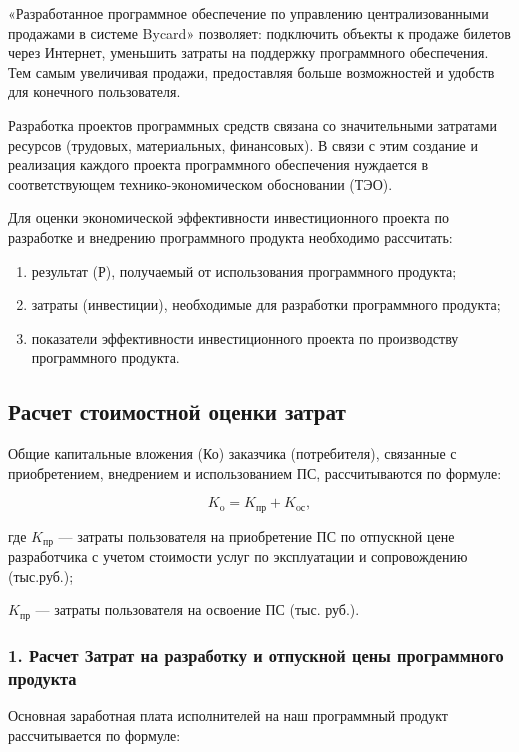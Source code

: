 «Разработанное программное обеспечение по управлению централизованными продажами в системе Bycard» позволяет: подключить объекты к продаже билетов через Интернет, уменьшить затраты на поддержку программного обеспечения. Тем самым увеличивая продажи, предоставляя больше возможностей и удобств для конечного пользователя.

Разработка проектов программных средств связана со значительными затратами ресурсов (трудовых, материальных, финансовых). В связи с этим создание и реализация каждого проекта программного обеспечения нуждается в соответствующем технико-экономическом обосновании (ТЭО).

Для оценки экономической эффективности инвестиционного проекта по разработке и внедрению программного продукта необходимо рассчитать:
\begin{enumerate}
    \item результат (Р), получаемый от использования программного продукта;
    \item затраты (инвестиции), необходимые для разработки программного продукта;
    \item показатели эффективности инвестиционного проекта по производству программного продукта.
\end{enumerate}

\subsection{Расчет стоимостной оценки затрат}

Общие капитальные вложения (Ко) заказчика (потребителя), связанные с приобретением, внедрением и использованием ПС, рассчитываются по формуле:

\begin{equation}
  K_{\text{o}} = K_{\text{пр}} + K_{\text{oс}},
\end{equation}

где \( K_{\text{пр}} \) --- затраты пользователя на приобретение ПС по отпускной цене разработчика с учетом стоимости услуг по эксплуатации и сопровождению (тыс.руб.);

\( K_{\text{пр}} \) --- затраты пользователя на освоение ПС (тыс. руб.).

\subsubsection{1. Расчет Затрат на разработку и отпускной цены программного продукта}

Основная заработная плата исполнителей на наш программный продукт рассчитывается по формуле:

